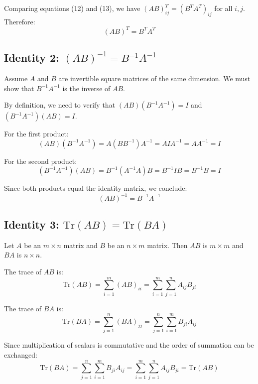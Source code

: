 Comparing equations (12) and (13), we have $(AB)^T_{ij} = (B^T A^T)_{ij}$ for all $i,j$. Therefore:
\begin{equation}
(AB)^T = B^T A^T
\end{equation}

\subsection*{Identity 2: $(AB)^{-1} = B^{-1} A^{-1}$}

Assume $A$ and $B$ are invertible square matrices of the same dimension. We must show that $B^{-1} A^{-1}$ is the inverse of $AB$.

By definition, we need to verify that $(AB)(B^{-1} A^{-1}) = I$ and $(B^{-1} A^{-1})(AB) = I$.

For the first product:
\begin{equation}
(AB)(B^{-1} A^{-1}) = A(BB^{-1})A^{-1} = A I A^{-1} = AA^{-1} = I
\end{equation}

For the second product:
\begin{equation}
(B^{-1} A^{-1})(AB) = B^{-1}(A^{-1}A)B = B^{-1} I B = B^{-1}B = I
\end{equation}

Since both products equal the identity matrix, we conclude:
\begin{equation}
(AB)^{-1} = B^{-1} A^{-1}
\end{equation}

\subsection*{Identity 3: $\text{Tr}(AB) = \text{Tr}(BA)$}

Let $A$ be an $m \times n$ matrix and $B$ be an $n \times m$ matrix. Then $AB$ is $m \times m$ and $BA$ is $n \times n$.

The trace of $AB$ is:
\begin{equation}
\text{Tr}(AB) = \sum_{i=1}^{m} (AB)_{ii} = \sum_{i=1}^{m} \sum_{j=1}^{n} A_{ij} B_{ji}
\end{equation}

The trace of $BA$ is:
\begin{equation}
\text{Tr}(BA) = \sum_{j=1}^{n} (BA)_{jj} = \sum_{j=1}^{n} \sum_{i=1}^{m} B_{ji} A_{ij}
\end{equation}

Since multiplication of scalars is commutative and the order of summation can be exchanged:
\begin{equation}
\text{Tr}(BA) = \sum_{j=1}^{n} \sum_{i=1}^{m} B_{ji} A_{ij} = \sum_{i=1}^{m} \sum_{j=1}^{n} A_{ij} B_{ji} = \text{Tr}(AB)
\end{equation}

